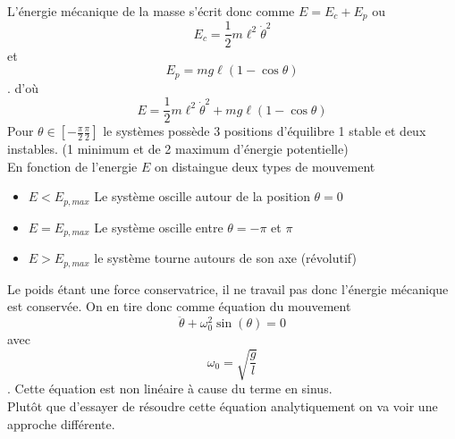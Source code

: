 \documentclass{article}
\begin{document}
L'énergie mécanique de la masse s'écrit donc comme $E=E_c +E_p$
ou $$E_c= \frac{1}{2} m \ell^2 \dot{\theta}^2$$ et $$E_p = mg\ell \left(1-\cos\theta \right)$$. d'où
\begin{equation}
    E= \frac{1}{2} m \ell^2 \dot{\theta}^2+mg\ell \left(1-\cos\theta \right)
\end{equation}
Pour $\theta \in [-\frac{\pi}{2} \frac{\pi}{2}]$ le systèmes possède 3 positions d'équilibre 1 stable et deux instables. (1 minimum et de 2  maximum d'énergie potentielle) \\
En fonction de l'energie $E$ on distaingue deux types de mouvement 
\begin{itemize}
    \item $E<E_{p, max}$ Le système oscille autour de la position $\theta = 0$
    \item $E=E_{p, max}$ Le système oscille entre $\theta=-\pi $ et $\pi$
    \item $E > E_{p, max}$ le système tourne autours de son axe (révolutif)
\end{itemize}


Le poids étant une force conservatrice, il ne travail pas donc l'énergie mécanique est conservée.
On en tire donc comme équation du mouvement 
\begin{equation}
    \ddot{\theta} + \omega_0^2\sin(\theta)=0
\end{equation}
avec $$\omega_0 = \sqrt{\frac{g}{l}}$$. Cette équation est non linéaire à cause du terme en sinus. \\
Plutôt que d'essayer de résoudre cette équation analytiquement on va voir une approche différente. 
\end{document}

